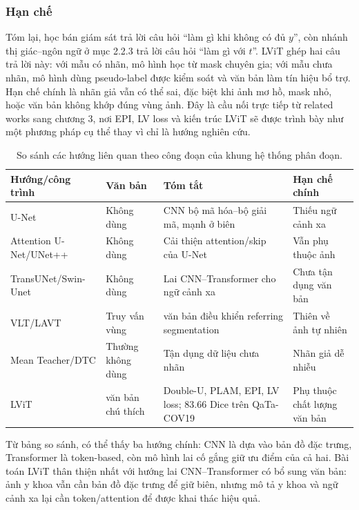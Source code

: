\subsubsection{Hạn chế}

Tóm lại, học bán giám sát trả lời câu hỏi ``làm gì khi không có đủ \(y\)'', còn nhánh thị giác--ngôn ngữ ở mục 2.2.3 trả lời câu hỏi ``làm gì với \(t\)''. LViT ghép hai câu trả lời này: với mẫu có nhãn, mô hình học từ mask chuyên gia; với mẫu chưa nhãn, mô hình dùng pseudo-label được kiểm soát và văn bản làm tín hiệu bổ trợ. Hạn chế chính là nhãn giả vẫn có thể sai, đặc biệt khi ảnh mơ hồ, mask nhỏ, hoặc văn bản không khớp đúng vùng ảnh. Đây là cầu nối trực tiếp từ related works sang chương 3, nơi EPI, LV loss và kiến trúc LViT sẽ được trình bày như một phương pháp cụ thể thay vì chỉ là hướng nghiên cứu.

\begin{table}[!t]
  \centering
  \caption{So sánh các hướng liên quan theo công đoạn của khung hệ thống phân đoạn.}
  \label{tab:related-comparison}
  \scriptsize
  \renewcommand{\arraystretch}{1.15}
  \setlength{\tabcolsep}{5pt}
  \begin{tabularx}{\textwidth}{@{}l L L L@{}}
    \toprule
    Hướng/công trình & Văn bản & Tóm tắt & Hạn chế chính \\
    \midrule
    U-Net \cite{ronneberger2015unet} & Không dùng & CNN bộ mã hóa--bộ giải mã, mạnh ở biên & Thiếu ngữ cảnh xa \\
    Attention U-Net/UNet++ \cite{oktay2018attention,zhou2018unetpp} & Không dùng & Cải thiện attention/skip của U-Net & Vẫn phụ thuộc ảnh \\
    TransUNet/Swin-Unet \cite{chen2021transunet,cao2021swinunet} & Không dùng & Lai CNN--Transformer cho ngữ cảnh xa & Chưa tận dụng văn bản \\
    VLT/LAVT \cite{ding2021vlt,yang2022lavt} & Truy vấn vùng & văn bản điều khiển referring segmentation & Thiên về ảnh tự nhiên \\
    Mean Teacher/DTC \cite{tarvainen2017meanteacher,luo2021dtc} & Thường không dùng & Tận dụng dữ liệu chưa nhãn & Nhãn giả dễ nhiễu \\
    LViT \cite{li2023lvit} & văn bản chú thích & Double-U, PLAM, EPI, LV loss; 83.66 Dice trên QaTa-COV19 & Phụ thuộc chất lượng văn bản \\
    \bottomrule
  \end{tabularx}
\end{table}
\FloatBarrier

Từ bảng so sánh, có thể thấy ba hướng chính: CNN là dựa vào bản đồ đặc trưng, Transformer là token-based, còn mô hình lai cố gắng giữ ưu điểm của cả hai. Bài toán LViT thân thiện nhất với hướng lai CNN--Transformer có bổ sung văn bản: ảnh y khoa vẫn cần bản đồ đặc trưng để giữ biên, nhưng mô tả y khoa và ngữ cảnh xa lại cần token/attention để được khai thác hiệu quả.

